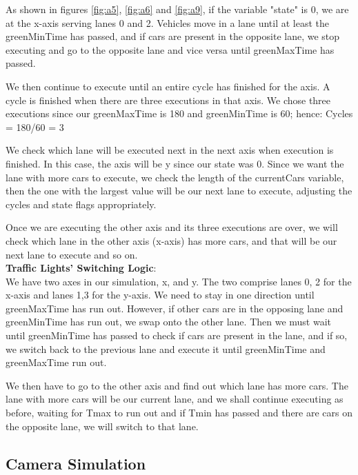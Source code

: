 \documentclass[12pt, a4paper,titlepage]{article}
\begin{document}
As shown in figures \ref{fig:a5}, \ref{fig:a6} and \ref{fig:a9}, if the variable "state" is 0, we are at the x-axis serving lanes 0 and 2. Vehicles move in a lane until at least the greenMinTime has passed, and if cars are present in the opposite lane, we stop executing and go to the opposite lane and vice versa until greenMaxTime has passed.

We then continue to execute until an entire cycle has finished for the axis. A cycle is finished when there are three executions in that axis. We chose three executions since our greenMaxTime is 180 and greenMinTime is 60; hence: Cycles = 180/60 = 3

We check which lane will be executed next in the next axis when execution is finished. In this case, the axis will be y since our state was 0. Since we want the lane with more cars to execute, we check the length of the currentCars variable, then the one with the largest value will be our next lane to execute, adjusting the cycles and state flags appropriately.

Once we are executing the other axis and its three executions are over, we will check which lane in the other axis (x-axis) has more cars, and that will be our next lane to execute and so on.\\

\textbf{Traffic Lights' Switching Logic}:\\

We have two axes in our simulation, x, and y. The two comprise lanes 0, 2 for the x-axis and lanes 1,3 for the y-axis. We need to stay in one direction until greenMaxTime has run out. However, if other cars are in the opposing lane and greenMinTime has run out, we swap onto the other lane. Then we must wait until greenMinTime  has passed to check if cars are present in the lane, and if so, we switch back to the previous lane and execute it until greenMinTime and greenMaxTime run out.

We then have to go to the other axis and find out which lane has more cars. The lane with more cars will be our current lane, and we shall continue executing as before, waiting for Tmax to run out and if Tmin has passed and there are cars on the opposite lane, we will switch to that lane.

\newpage
\subsection{Camera Simulation}
\label{subsec_camera}
\end{document}
